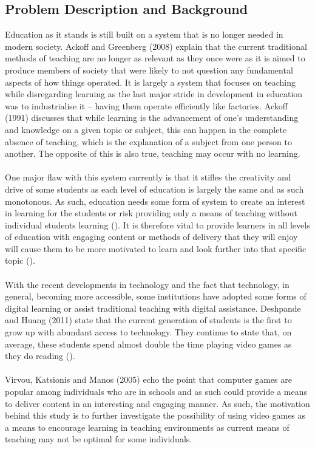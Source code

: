 \subsection{Problem Description and Background}
Education as it stands is still built on a system that is no longer needed in modern society. Ackoff and Greenberg (2008) explain that the current traditional methods of teaching are no longer as relevant as they once were as it is aimed to produce members of society that were likely to not question any fundamental aspects of how things operated. It is largely a system that focuses on teaching while disregarding learning as the last major stride in development in education was to industrialise it – having them operate efficiently like factories. Ackoff (1991) discusses that while learning is the advancement of one’s understanding and knowledge on a given topic or subject, this can happen in the complete absence of teaching, which is the explanation of a subject from one person to another. The opposite of this is also true, teaching may occur with no learning.
\\\\
One major flaw with this system currently is that it stifles the creativity and drive of some students as each level of education is largely the same and as such monotonous. As such, education needs some form of system to create an interest in learning for the students or risk providing only a means of teaching without individual students learning (\cite{Ackoff2008}). It is therefore vital to provide learners in all levels of education with engaging content or methods of delivery that they will enjoy will cause them to be more motivated to learn and look further into that specific topic (\cite{Ackoff2008}). 
\\\\
With the recent developments in technology and the fact that technology, in general, becoming more accessible, some institutions have adopted some forms of digital learning or assist traditional teaching with digital assistance. Deshpande and Huang (2011) state that the current generation of students is the first to grow up with abundant access to technology. They continue to state that, on average, these students spend almost double the time playing video games as they do reading (\cite{Deshpande2011}).
\\\\
Virvou, Katsionis and Manos (2005) echo the point that computer games are popular among individuals who are in schools and as such could provide a means to deliver content in an interesting and engaging manner. As such, the motivation behind this study is to further investigate the possibility of using video games as a means to encourage learning in teaching environments as current means of teaching may not be optimal for some individuals. 


